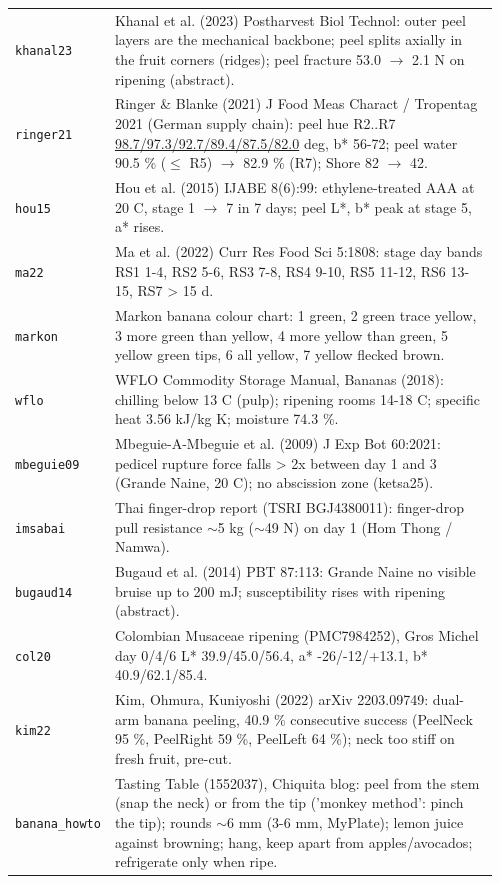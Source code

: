 \documentclass[10.5pt,a4paper]{article}
\begin{document}
{\begin{longtable}{@{}p{0.16\linewidth}p{0.8\linewidth}@{}}
\texttt{khanal23} & Khanal et al. (2023) Postharvest Biol Technol: outer peel layers are the mechanical backbone; peel splits axially in the fruit corners (ridges); peel fracture 53.0 $\to$ 2.1 N on ripening (abstract). \\
\texttt{ringer21} & Ringer \& Blanke (2021) J Food Meas Charact / Tropentag 2021 (German supply chain): peel hue R2..R7 \url{98.7/97.3/92.7/89.4/87.5/82.0} deg, b* 56-72; peel water 90.5 \% ($\le$ R5) $\to$ 82.9 \% (R7); Shore 82 $\to$ 42. \\
\texttt{hou15} & Hou et al. (2015) IJABE 8(6):99: ethylene-treated AAA at 20 C, stage 1 $\to$ 7 in 7 days; peel L*, b* peak at stage 5, a* rises. \\
\texttt{ma22} & Ma et al. (2022) Curr Res Food Sci 5:1808: stage day bands RS1 1-4, RS2 5-6, RS3 7-8, RS4 9-10, RS5 11-12, RS6 13-15, RS7 > 15 d. \\
\texttt{markon} & Markon banana colour chart: 1 green, 2 green trace yellow, 3 more green than yellow, 4 more yellow than green, 5 yellow green tips, 6 all yellow, 7 yellow flecked brown. \\
\texttt{wflo} & WFLO Commodity Storage Manual, Bananas (2018): chilling below 13 C (pulp); ripening rooms 14-18 C; specific heat 3.56 kJ/kg K; moisture 74.3 \%. \\
\texttt{mbeguie09} & Mbeguie-A-Mbeguie et al. (2009) J Exp Bot 60:2021: pedicel rupture force falls > 2x between day 1 and 3 (Grande Naine, 20 C); no abscission zone (ketsa25). \\
\texttt{imsabai} & Thai finger-drop report (TSRI BGJ4380011): finger-drop pull resistance $\sim$5 kg ($\sim$49 N) on day 1 (Hom Thong / Namwa). \\
\texttt{bugaud14} & Bugaud et al. (2014) PBT 87:113: Grande Naine no visible bruise up to 200 mJ; susceptibility rises with ripening (abstract). \\
\texttt{col20} & Colombian Musaceae ripening (PMC7984252), Gros Michel day 0/4/6 L* 39.9/45.0/56.4, a* -26/-12/+13.1, b* 40.9/62.1/85.4. \\
\texttt{kim22} & Kim, Ohmura, Kuniyoshi (2022) arXiv 2203.09749: dual-arm banana peeling, 40.9 \% consecutive success (PeelNeck 95 \%, PeelRight 59 \%, PeelLeft 64 \%); neck too stiff on fresh fruit, pre-cut. \\
\texttt{banana\_\allowbreak{}howto} & Tasting Table (1552037), Chiquita blog: peel from the stem (snap the neck) or from the tip ('monkey method': pinch the tip); rounds $\sim$6 mm (3-6 mm, MyPlate); lemon juice against browning; hang, keep apart from apples/avocados; refrigerate only when ripe. \\

\end{longtable}}
\end{document}
